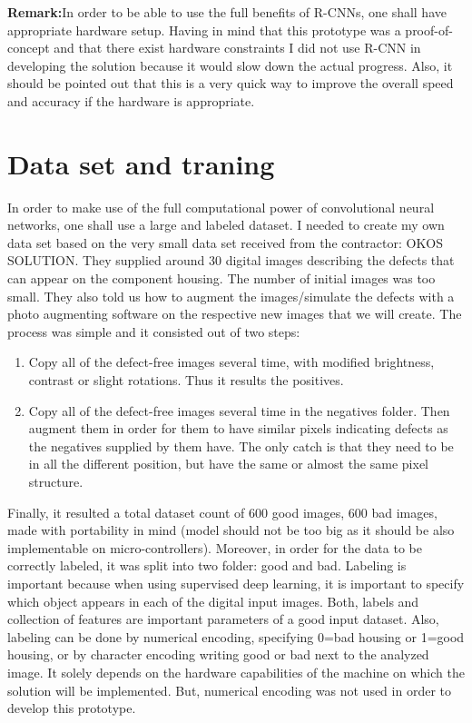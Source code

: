 \documentclass[12pt,a4paper,twoside]{report}
\begin{document}
\textbf{Remark:}In order to be able to use the full benefits of R-CNNs, one shall have appropriate hardware setup. Having in mind that this prototype was a proof-of-concept and that there exist hardware constraints I did not use R-CNN in developing the solution because it would slow down the actual progress. Also, it should be pointed out that this is a very quick way to improve the overall speed and accuracy if the hardware is appropriate.


\section{Data set and traning}
In order to make use of the full computational power of convolutional neural networks, one shall use a large and labeled dataset. I needed to create my own data set based on the very small data set received from the contractor: OKOS SOLUTION. They supplied around 30 digital images describing the defects that can appear on the component housing. The number of initial images was too small. They also told us how to augment the images/simulate the defects with a photo augmenting software on the respective new images that we will create. The process was simple and it consisted out of two steps:
\begin{enumerate}
    \item Copy all of the defect-free images several time, with modified brightness, contrast or slight rotations. Thus it results the positives. 
    \item Copy all of the defect-free images several time in the negatives folder. Then augment them in order for them to have similar pixels indicating defects as the negatives supplied by them have. The only catch is that they need to be in all the different position, but have the same or almost the same pixel structure.
\end{enumerate}

Finally, it resulted a total dataset count of 600 good images, 600 bad images, made with portability in mind (model should not be too big as it should be also implementable on micro-controllers). Moreover, in order for the data to be correctly labeled, it was split into two folder: good and bad. Labeling is important because when using supervised deep learning, it is important to specify which object appears in each of the digital input images. Both, labels and collection of features are important parameters of a good input dataset. Also, labeling can be done by numerical encoding, specifying 0=bad housing or 1=good housing, or by character encoding writing good or bad next to the analyzed image. It solely depends on the hardware capabilities of the machine on which the solution will be implemented. But, numerical encoding was not used in order to develop this prototype.
\end{document}
